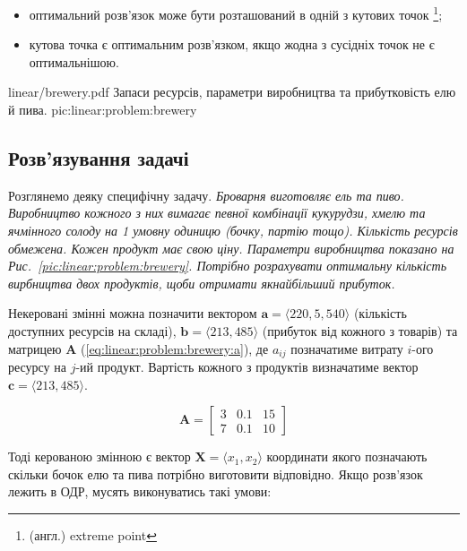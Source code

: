 \documentclass[\main/book.tex]{subfiles}
\begin{document}
\begin{conclusions}
\begin{itemize}
 \item оптимальний розв'язок може бути розташований в одній з кутових точок \footnote{(англ.) extreme point};
 \item кутова точка є оптимальним розв'язком, якщо жодна з сусідніх точок не є оптимальнішою.
\end{itemize}
\label{conclusion:linear:optimal_solution}
\end{conclusions}

\illustration
 {linear/brewery.pdf}
 {Запаси ресурсів, параметри ви\-роб\-ниц\-тва та прибутковість елю й пива.}
 {pic:linear:problem:brewery}

\subsection{Розв'язування задачі}

Розглянемо деяку специфічну задачу. \textit{Броварня виготовляє ель та пиво. Виробництво кожного з них вимагає певної комбінації кукурудзи, хмелю та ячмінного солоду на 1 умовну одиницю (бочку, партію тощо). Кількість ресурсів обмежена. Кожен продукт має свою ціну. Параметри виробництва показано на Рис.~\ref{pic:linear:problem:brewery}. Потрібно розрахувати оптимальну кількість вирбництва двох продуктів, щоби отримати якнайбільший прибуток.}

Некеровані змінні можна позначити вектором $\mathbf{a} = {\langle 220, 5, 540 \rangle}$ (кількість доступних ресурсів на складі), $\mathbf{b} = {\langle 213, 485 \rangle}$ (прибуток від кожного з товарів) та матрицею $\mathbf{A}$ (\ref{eq:linear:problem:brewery:a}), де $a_{ij}$ позначатиме витрату $i$-ого ресурсу на $j$-ий продукт. Вартість кожного з продуктів визначатиме вектор $\mathbf{c} = {\langle 213, 485 \rangle}$.

\begin{equation}
 \mathbf{A} = \begin{bmatrix}
               3 & 0.1 & 15 \\
               7 & 0.1 & 10
              \end{bmatrix}
 \label{eq:linear:problem:brewery:a}
\end{equation}

Тоді керованою змінною є вектор $\mathbf{X} = \langle x_1, x_2 \rangle$ координати якого позначають скільки бочок елю та пива потрібно виготовити відповідно. Якщо розв'язок лежить в ОДР, мусять виконуватись такі умови:
\end{document}
